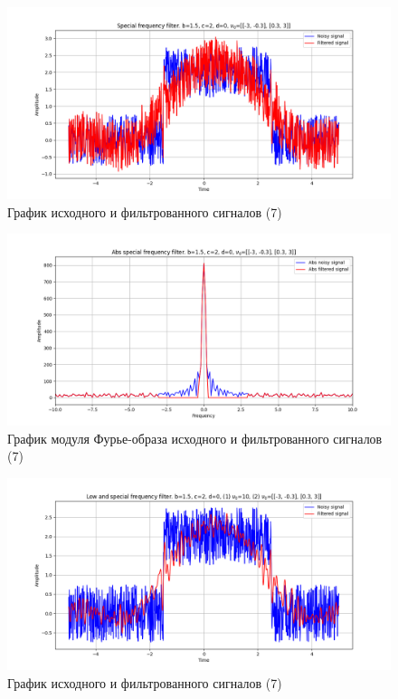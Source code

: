 \documentclass[a4paper, 12pt]{article}
\begin{document}
    \begin{figure}[!htb]
        \centering
        \includegraphics[scale=0.48]{7_u_flt_u_nospec.png}
        \captionsetup{skip=0pt}
        \caption{График исходного и фильтрованного сигналов (7)}
        \label{fig:dklfksdjfo}
    \end{figure}
    \begin{figure}[H]
        \centering
        \includegraphics[scale=0.48]{7_abs_u_U_nospec.png}
        \captionsetup{skip=0pt}
        \caption{График модуля Фурье-образа исходного и фильтрованного сигналов (7)}
        \label{fig:dfsjusdf}
    \end{figure}
    \begin{figure}[!htb]
        \centering
        \includegraphics[scale=0.48]{7_3_u_flt_u_nospec.png}
        \captionsetup{skip=0pt}
        \caption{График исходного и фильтрованного сигналов (7)}
        \label{fig:fsdjflsfl}
    \end{figure}
\end{document}
